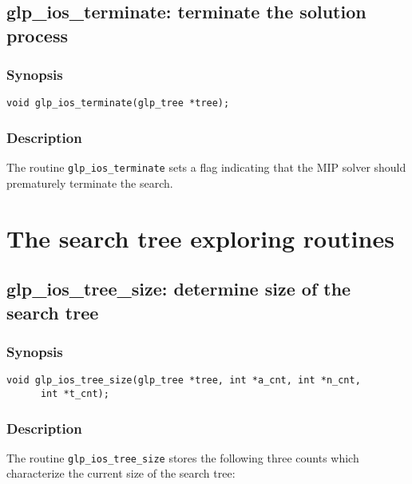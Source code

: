 \newpage

\subsection{glp\_ios\_terminate: terminate the solution process}

\subsubsection*{Synopsis}

\begin{verbatim}
void glp_ios_terminate(glp_tree *tree);
\end{verbatim}

\subsubsection*{Description}

The routine \verb|glp_ios_terminate| sets a flag indicating that the
MIP solver should prematurely terminate the search.


\newpage

\section{The search tree exploring routines}

\subsection{glp\_ios\_tree\_size: determine size of the search tree}

\subsubsection*{Synopsis}

\begin{verbatim}
void glp_ios_tree_size(glp_tree *tree, int *a_cnt, int *n_cnt,
      int *t_cnt);
\end{verbatim}

\subsubsection*{Description}

The routine \verb|glp_ios_tree_size| stores the following three counts
which characterize the current size of the search tree:

